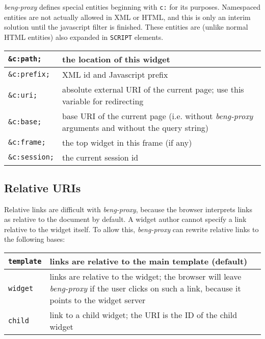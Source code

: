 \documentclass[a4paper,12pt]{article}
\begin{document}
\emph{beng-proxy} defines special entities beginning with \texttt{c:}
for its purposes.  Namespaced entities are not actually allowed in XML
or HTML, and this is only an interim solution until the javascript
filter is finished.  These entities are (unlike normal HTML entities)
also expanded in \texttt{SCRIPT} elements.

\begin{tabular}{|l|p{8cm}|}
\hline
\texttt{\&c:path;} & the location of this widget \\
\hline
\texttt{\&c:prefix;} & XML id and Javascript prefix \\
\hline
\texttt{\&c:uri;} & absolute external URI of the current page; use
this variable for redirecting \\
\hline

\texttt{\&c:base;} & base URI of the current page (i.e. without
\emph{beng-proxy} arguments and without the query string) \\

\hline
\texttt{\&c:frame;} & the top widget in this frame (if any) \\
\hline
\texttt{\&c:session;} & the current session id \\
\hline
\end{tabular}

\subsection{Relative URIs}

Relative links are difficult with \emph{beng-proxy}, because the
browser interprets links as relative to the document by default.  A
widget author cannot specify a link relative to the widget itself.  To
allow this, \emph{beng-proxy} can rewrite relative links to the
following bases:

\begin{tabular}{|l|p{10cm}|}
\hline

\texttt{template} & links are relative to the main template (default)
\\

\hline

\texttt{widget} & links are relative to the widget; the browser will
leave \emph{beng-proxy} if the user clicks on such a link, because it
points to the widget server \\

\hline

\texttt{child} & link to a child widget; the URI is the ID of the
child widget \\

\hline
\end{tabular}
\end{document}
